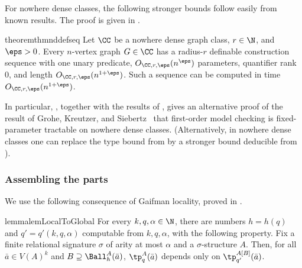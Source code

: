 For nowhere dense classes, the following stronger bounds follow easily from known results. The proof is given in .

\begin{restatable}{theorem}{thmnddefseq}\label{thm:nd-def-seq}
  Let $\CC$ be a nowhere dense graph class, $r\in\N$, and $\eps>0$.
  Every $n$-vertex graph $G\in\CC$ has a radius-$r$ definable construction sequence with one unary predicate, $O_{\CC,r,\eps}(n^\eps)$ parameters, quantifier rank $0$, and length $O_{\CC,r,\eps}(n^{1+\eps})$.
  Such a sequence can be computed in time $O_{\CC,r,\eps}(n^{1+\eps})$.
\end{restatable}

In particular, , together with the results of , gives an alternative proof of the result of Grohe, Kreutzer, and Siebertz~\cite{gks} that first-order model checking is fixed-parameter tractable on nowhere dense classes.
(Alternatively, in nowhere dense classes one can replace the type bound from   by a stronger bound deducible from \cite{number-of-types}).

\subsubsection{Assembling the parts}\label{sec:skel-assembly}

We use the following consequence of Gaifman locality, proved in .

\begin{restatable}{lemma}{lemLocalToGlobal}\label{lem:local-to-global}
For every $k,q,\alpha \in\N$, there are numbers $h=h(q)$ and $q'=q'(k,q,\alpha)$ computable from $k,q,\alpha$,
 with the following property.
Fix a finite relational signature $\sigma$ of arity at most $\alpha$ and a $\sigma$-structure $A$.
Then, for all $\bar a\in V(A)^k$
and $B\supseteq \Ball_h^A(\bar a)$,
$\tp_q^A(\bar a)$ depends only on
 $\tp_{q'}^{A[B]}(\bar a)$.
\end{restatable}

